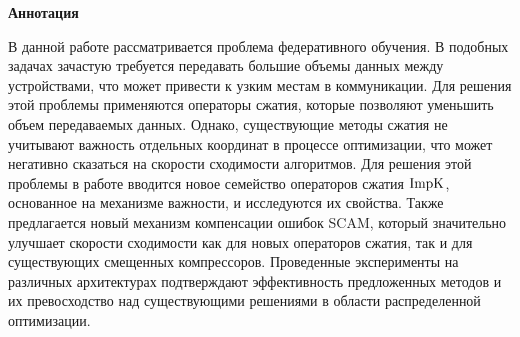 \begin{center}
    \Large{\textbf{Аннотация}}
\end{center}

    В данной работе рассматривается проблема федеративного обучения. В подобных задачах зачастую требуется передавать большие объемы данных между устройствами, что может привести к узким местам в коммуникации. Для решения этой проблемы применяются операторы сжатия, которые позволяют уменьшить объем передаваемых данных. Однако, существующие методы сжатия не учитывают важность отдельных координат в процессе оптимизации, что может негативно сказаться на скорости сходимости алгоритмов. Для решения этой проблемы в работе вводится новое семейство операторов сжатия $\operatorname{ImpK}$, основанное на механизме важности, и исследуются их свойства. Также предлагается новый механизм компенсации ошибок SCAM, который значительно улучшает скорости сходимости как для новых операторов сжатия, так и для существующих смещенных компрессоров. Проведенные эксперименты на различных архитектурах подтверждают эффективность предложенных методов и их превосходство над существующими решениями в области распределенной оптимизации.